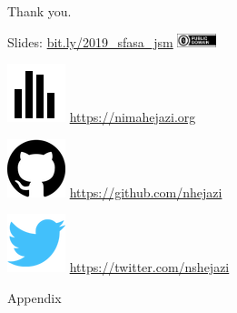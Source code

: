 \documentclass{beamer}
\begin{document}
\begin{frame}[c]{Thank you.}

\large
Slides: \href{http://bit.ly/2019\_sfasa\_jsm}{bit.ly/2019\_sfasa\_jsm}
  \quad
\includegraphics[height=4mm]{Figs/cc-zero.png}

\vspace{2mm}
\includegraphics[scale=0.14]{homepage.png} \url{https://nimahejazi.org}

\vspace{2mm}
\includegraphics[scale=0.11]{github-icon.png}
  \url{https://github.com/nhejazi}

\vspace{2mm}
\includegraphics[scale=0.14]{twitter-icon.png}
  \url{https://twitter.com/nshejazi}

\end{frame}


\appendix
\begin{frame}[standout]
  Appendix
\end{frame}

\end{document}
